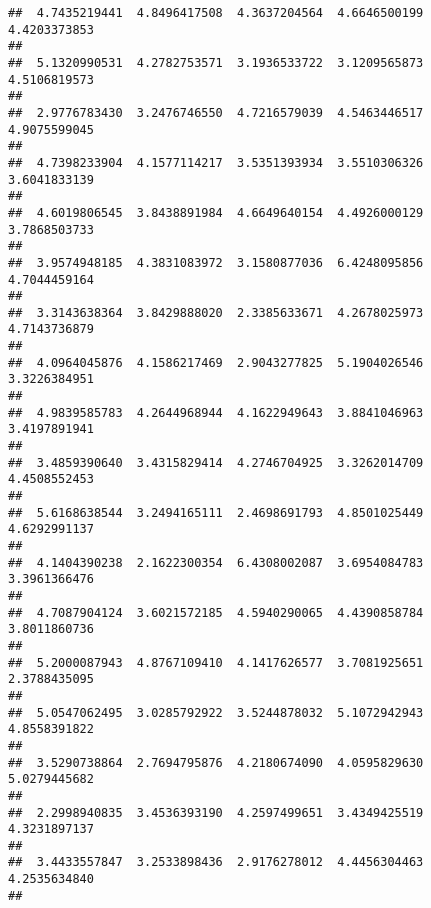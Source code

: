 \documentclass[]{article}
\begin{document}
\begin{verbatim}
##  4.7435219441  4.8496417508  4.3637204564  4.6646500199  4.4203373853 
##                                                                       
##  5.1320990531  4.2782753571  3.1936533722  3.1209565873  4.5106819573 
##                                                                       
##  2.9776783430  3.2476746550  4.7216579039  4.5463446517  4.9075599045 
##                                                                       
##  4.7398233904  4.1577114217  3.5351393934  3.5510306326  3.6041833139 
##                                                                       
##  4.6019806545  3.8438891984  4.6649640154  4.4926000129  3.7868503733 
##                                                                       
##  3.9574948185  4.3831083972  3.1580877036  6.4248095856  4.7044459164 
##                                                                       
##  3.3143638364  3.8429888020  2.3385633671  4.2678025973  4.7143736879 
##                                                                       
##  4.0964045876  4.1586217469  2.9043277825  5.1904026546  3.3226384951 
##                                                                       
##  4.9839585783  4.2644968944  4.1622949643  3.8841046963  3.4197891941 
##                                                                       
##  3.4859390640  3.4315829414  4.2746704925  3.3262014709  4.4508552453 
##                                                                       
##  5.6168638544  3.2494165111  2.4698691793  4.8501025449  4.6292991137 
##                                                                       
##  4.1404390238  2.1622300354  6.4308002087  3.6954084783  3.3961366476 
##                                                                       
##  4.7087904124  3.6021572185  4.5940290065  4.4390858784  3.8011860736 
##                                                                       
##  5.2000087943  4.8767109410  4.1417626577  3.7081925651  2.3788435095 
##                                                                       
##  5.0547062495  3.0285792922  3.5244878032  5.1072942943  4.8558391822 
##                                                                       
##  3.5290738864  2.7694795876  4.2180674090  4.0595829630  5.0279445682 
##                                                                       
##  2.2998940835  3.4536393190  4.2597499651  3.4349425519  4.3231897137 
##                                                                       
##  3.4433557847  3.2533898436  2.9176278012  4.4456304463  4.2535634840 
##                                                                       

\end{verbatim}
\end{document}
